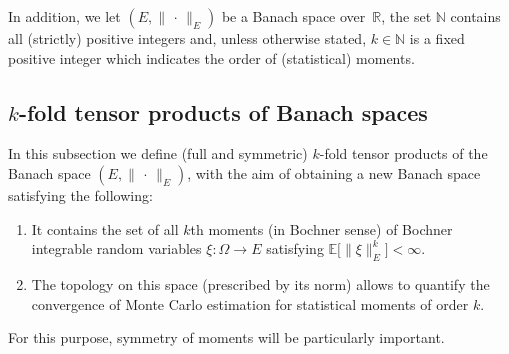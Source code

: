 \documentclass[reqno]{amsart}
\numberwithin{equation}{section}
\newcommand{\bbE}{\mathbb{E}}
\newcommand{\bbN}{\mathbb{N}}
\newcommand{\bbR}{\mathbb{R}}
\newcommand{\norm}[2]{     \| #1       \|_{ #2 }}
\newcommand{\from}{\colon}
\theoremstyle{remark}
\theoremstyle{definition}
\begin{document}
In addition, we let   
$(E,\norm{\,\cdot\,}{E})$ be a Banach space 
over~$\bbR$, the set $\bbN$ 
contains all 
(strictly) positive integers 
and, unless otherwise stated, 
$k \in \bbN$ is a fixed positive integer 
which indicates the order of (statistical) moments. 


\subsection{\texorpdfstring{$k$-fold}{k-fold} tensor products  
	of Banach spaces}\label{subsec:k-tensor}    

In this subsection we define 
(full and symmetric) $k$-fold 
tensor products 
of the Banach space $(E,\norm{\,\cdot\,}{E})$, 
with the aim of 
obtaining a new Banach space 
satisfying the following: 
% 
\begin{enumerate}[label={\normalfont(\roman*)}, leftmargin = 1cm]
	\item It contains the set of all 
	$k$th moments  
	(in Bochner sense)
	of Bochner integrable random 
	variables $\xi\from\Omega\to E$ 
	satisfying $\bbE\bigl[ \norm{\xi}{E}^k \bigr] < \infty$. 
	\item The topology on this space 
	(prescribed by its norm) allows to 
	quantify the convergence 
	of Monte Carlo estimation for  
	statistical moments of order $k$. 
\end{enumerate} 
%
For this purpose, symmetry of moments 
will be particularly important.  
\end{document}
